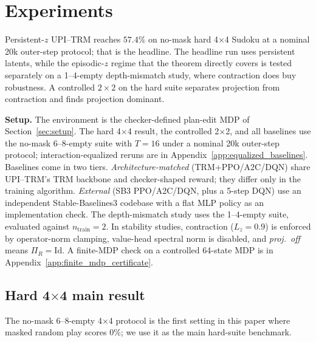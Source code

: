 \documentclass{article}
\theoremstyle{plain}
\theoremstyle{definition}
\theoremstyle{remark}
\begin{document}
\section{Experiments}
\label{sec:experiments}

Persistent-$z$ UPI--TRM reaches $57.4\%$ on no-mask hard 4$\times$4 Sudoku at a nominal 20k outer-step protocol; that is the headline. The headline run uses persistent latents, while the episodic-$z$ regime that the theorem directly covers is tested separately on a 1--4-empty depth-mismatch study, where contraction does buy robustness. A controlled $2\times 2$ on the hard suite separates projection from contraction and finds projection dominant.

\textbf{Setup.}
The environment is the checker-defined plan-edit MDP of Section~\ref{sec:setup}. The hard 4$\times$4 result, the controlled 2$\times$2, and all baselines use the no-mask 6--8-empty suite with $T{=}16$ under a nominal 20k outer-step protocol; interaction-equalized reruns are in Appendix~\ref{app:equalized_baselines}. Baselines come in two tiers. \emph{Architecture-matched} (TRM+PPO/A2C/DQN) share UPI--TRM's TRM backbone and checker-shaped reward; they differ only in the training algorithm. \emph{External} (SB3 PPO/A2C/DQN, plus a 5-step DQN) use an independent Stable-Baselines3 codebase with a flat MLP policy as an implementation check. The depth-mismatch study uses the 1--4-empty suite, evaluated against $n_{\mathrm{train}}{=}2$. In stability studies, contraction ($L_z{=}0.9$) is enforced by operator-norm clamping, value-head spectral norm is disabled, and \emph{proj.\ off} means $\Pi_R=\mathrm{Id}$. A finite-MDP check on a controlled 64-state MDP is in Appendix~\ref{app:finite_mdp_certificate}.

\subsection{Hard 4$\times$4 main result}
\label{sec:harder_puzzles}

The no-mask 6--8-empty 4$\times$4 protocol is the first setting in this paper where masked random play scores $0\%$; we use it as the main hard-suite benchmark.
\end{document}
